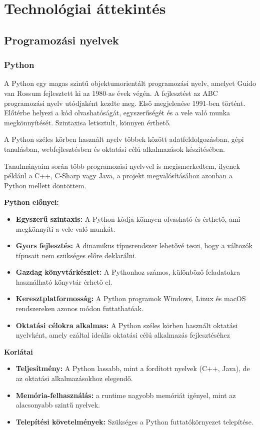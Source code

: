 \documentclass[]{thesis-ekf}
\begin{document}
	\chapter{Technológiai áttekintés} 
	\section{Programozási nyelvek}
	
	\subsection{Python}
	
	A Python\cite{Python} egy magas szintű objektumorientált programozási nyelv, amelyet Guido van Rossum fejlesztett ki az 1980-as évek végén. A fejlesztést az ABC programozási nyelv utódjaként kezdte meg. Első megjelenése 1991-ben történt. Előtérbe helyezi a kód olvashatóságát, egyszerűségét és a vele való munka megkönnyítését. Szintaxisa letisztult, könnyen érthető.
	
	A Python széles körben használt nyelv többek között adatfeldolgozásban, gépi tanulásban,	webfejlesztésben és oktatási célú alkalmazások készítésében.
	
	Tanulmányaim során több programozási nyelvvel is megismerkedtem, ilyenek például a C++\cite{C++}, C-Sharp\cite{C-Sharp} vagy Java\cite{Java}, a projekt megvalósításához azonban a Python mellett döntöttem.
	
	\textbf{Python előnyei:}
	\begin{itemize}
		\item \textbf{Egyszerű szintaxis:} A Python kódja könnyen olvasható és érthető, ami megkönnyíti a vele való munkát.
		\item \textbf{Gyors fejlesztés:} A dinamikus típusrendszer lehetővé teszi, hogy a változók típusait nem szükséges előre deklarálni.
		\item \textbf{Gazdag könyvtárkészlet:} A Pythonhoz számos, különböző feladatokra használható könyvtár érhető el.
		\item \textbf{Keresztplatformosság:} A Python programok Windows, Linux és macOS rendszereken azonos módon futtathatóak.
		\item \textbf{Oktatási célokra alkalmas:} A Python széles körben használt oktatási nyelvként, amely ezáltal ideális oktatási célú alkalmazás fejlesztéséhez
	\end{itemize}
	
	\textbf{Korlátai}
	\begin{itemize}
		\item \textbf{Teljesítmény:} A Python lassabb, mint a fordított nyelvek (C++, Java), de az oktatási alkalmazásokhoz elegendő.
		\item \textbf{Memória-felhasználás:} a runtime nagyobb memóriát igényel, mint az alacsonyabb szintű nyelvek.
		\item \textbf{Telepítési követelmények:} Szükséges a Python futtatókörnyezet telepítése.
	\end{itemize}
	
\end{document}
